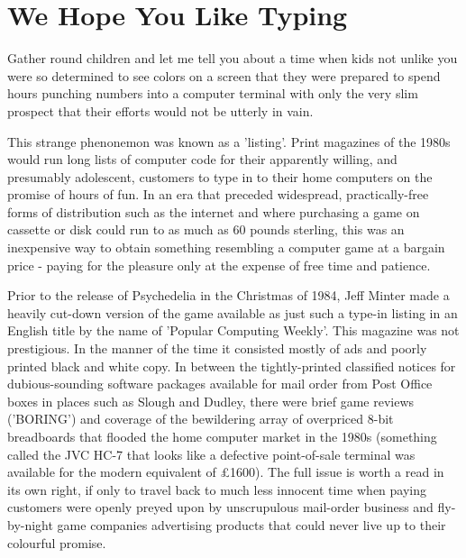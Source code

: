 \chapter{We Hope You Like Typing} 
\lstset{style=6502Style}
Gather round children and let me tell you about a time when kids not unlike you were
so determined to see colors on a screen that they were prepared to spend hours punching
numbers into a computer terminal with only the very slim prospect that their efforts would not be utterly 
in vain.

This strange phenonemon was known as a 'listing'. Print magazines of the 1980s would run long lists of 
computer code for their apparently willing, and presumably adolescent, customers to type in to their home computers on the promise of
hours of fun. In an era that preceded widespread, practically-free forms of distribution such as the internet and
where purchasing a game on cassette or disk could run to as much as 60 pounds sterling,
this was an inexpensive way to obtain something resembling a computer game at a bargain price - paying for the pleasure
only at the expense of free time and patience.  

Prior to the release of Psychedelia in the Christmas of 1984, Jeff Minter made a heavily cut-down version of the
game available as just such a type-in listing in an English title by the name of 'Popular Computing Weekly'. 
This magazine was not prestigious. In the manner of the time it consisted mostly of ads and poorly printed black
and white copy. In between the tightly-printed classified notices for dubious-sounding software packages available 
for mail order from Post Office boxes in places such as Slough and Dudley, there were brief game reviews ('BORING')
and coverage of the bewildering array of overpriced 8-bit breadboards that flooded the home computer market in the 1980s (something
called the JVC HC-7 that looks like a defective point-of-sale terminal was available for the modern equivalent of £1600). The full issue
is worth a read in its own right, if only to travel back to much less innocent time when paying customers were openly preyed upon
by unscrupulous mail-order business and fly-by-night game companies advertising products that could never live up to their colourful
promise.

